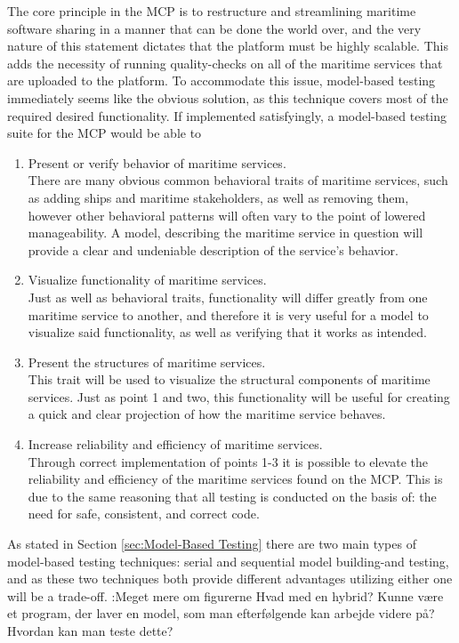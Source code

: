 The core principle in the MCP is to restructure and streamlining maritime software sharing in a manner that can be done the world over, and the very nature of this statement dictates that the platform must be highly scalable. This adds the necessity of running quality-checks on all of the maritime services that are uploaded to the platform. To accommodate this issue, model-based testing immediately seems like the obvious solution, as this technique covers most of the required desired functionality. If implemented satisfyingly, a model-based testing suite for the MCP would be able to
\begin{enumerate}
	\item Present or verify behavior of maritime services.\\
	There are many obvious common behavioral traits of maritime services, such as adding ships and maritime stakeholders, as well as removing them, however other behavioral patterns will often vary to the point of lowered manageability. A model, describing the maritime service in question will provide a clear and undeniable description of the service's behavior.
	\item Visualize functionality of maritime services.\\
	Just as well as behavioral traits, functionality will differ greatly from one maritime service to another, and therefore it is very useful for a model to visualize said functionality, as well as verifying that it works as intended.
	\item Present the structures of maritime services.\\
	This trait will be used to visualize the structural components of maritime services. Just as point 1 and two, this functionality will be useful for creating a quick and clear projection of how the maritime service behaves.
	\item Increase reliability and efficiency of maritime services.\\
	Through correct implementation of points 1-3 it is possible to elevate the reliability and efficiency of the maritime services found on the MCP. This is due to the same reasoning that all testing is conducted on the basis of: the need for safe, consistent, and correct code.
\end{enumerate}

As stated in Section \ref{sec:Model-Based Testing} there are two main types of model-based testing techniques: serial and sequential model building-and testing, and as these two techniques both provide different advantages utilizing either one will be a trade-off.
\TODO:{Meget mere om figurerne
Hvad med en hybrid? Kunne være et program, der laver en model, som man efterfølgende kan arbejde videre på?
Hvordan kan man teste dette?}

